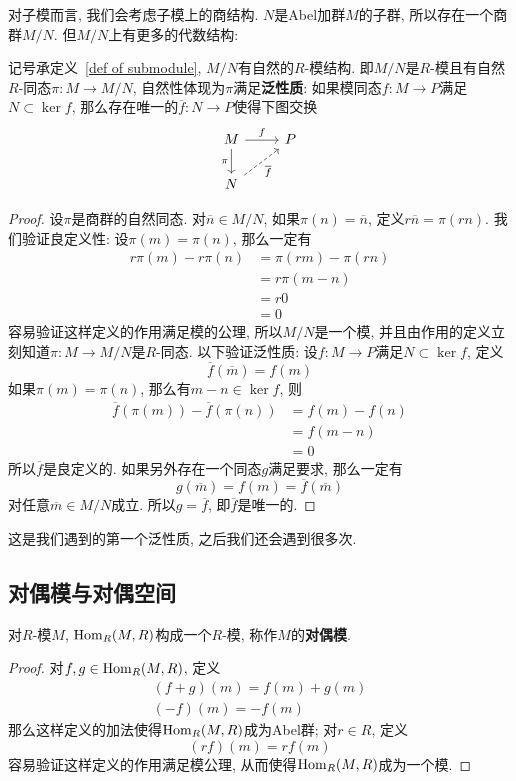 对子模而言, 我们会考虑子模上的商结构.
$N$是Abel加群$M$的子群, 所以存在一个商群$M/N$.
但$M/N$上有更多的代数结构:
\begin{prop}\label{quotient module}
    记号承定义~\ref{def of submodule}, $M/N$有自然的$R$-模结构.
    即$M/N$是$R$-模且有自然$R$-同态$\pi:M\to M/N$, 自然性体现为$\pi$满足\textbf{泛性质}:
    如果模同态$f:M\to P$满足$N\subset\ker{f}$, 那么存在唯一的$\overline{f}:N\to P$使得下图交换
    \[\begin{tikzcd}
        M \arrow[r, "f"] \arrow[d, "\pi"'] & P \\
        N \arrow[ur, dashed, "\overline{f}"'] &
    \end{tikzcd}\]
\end{prop}
\begin{proof}
    设$\pi$是商群的自然同态.
    对$\overline{n}\in M/N$, 如果$\pi(n)=\overline{n}$, 定义$r\overline{n}=\pi(rn)$.
    我们验证良定义性: 设$\pi(m)=\pi(n)$, 那么一定有
    \begin{align*}
        r\pi(m)-r\pi(n)&=\pi(rm)-\pi(rn)\\
        &=r\pi(m-n)\\
        &=r0\\
        &=0
    \end{align*}
    容易验证这样定义的作用满足模的公理, 所以$M/N$是一个模, 并且由作用的定义立刻知道$\pi:M\to M/N$是$R$-同态.
    以下验证泛性质: 设$f:M\to P$满足$N\subset\ker{f}$, 定义
    \[\overline{f}(\overline{m})=f(m)\]
    如果$\pi(m)=\pi(n)$, 那么有$m-n\in\ker{f}$, 则
    \begin{align*}
        \overline{f}(\pi(m))-\overline{f}(\pi(n))&=f(m)-f(n)\\
        &=f(m-n)\\
        &=0
    \end{align*}
    所以$\overline{f}$是良定义的.
    如果另外存在一个同态$g$满足要求, 那么一定有
    \[g(\overline{m})=f(m)=\overline{f}(\overline{m})\]
    对任意$\overline m\in M/N$成立.
    所以$g=\overline{f}$, 即$\overline{f}$是唯一的.
\end{proof}

这是我们遇到的第一个泛性质, 之后我们还会遇到很多次.

\subsection*{对偶模与对偶空间}

\begin{prop}\label{defn of dual}
    对$R$-模$M$, $\operatorname{Hom}_R(M,R)$构成一个$R$-模, 称作$M$的\textbf{对偶模}.
\end{prop}
\begin{proof}
    对$f,g\in\operatorname{Hom}_R(M,R)$, 定义
    \begin{gather*}
        (f+g)(m)=f(m)+g(m)\\
        (-f)(m)=-f(m)
    \end{gather*}
    那么这样定义的加法使得$\operatorname{Hom}_R(M,R)$成为Abel群;
    对$r\in R$, 定义
    \[(rf)(m)=rf(m)\]
    容易验证这样定义的作用满足模公理, 从而使得$\operatorname{Hom}_R(M,R)$成为一个模.
\end{proof}

